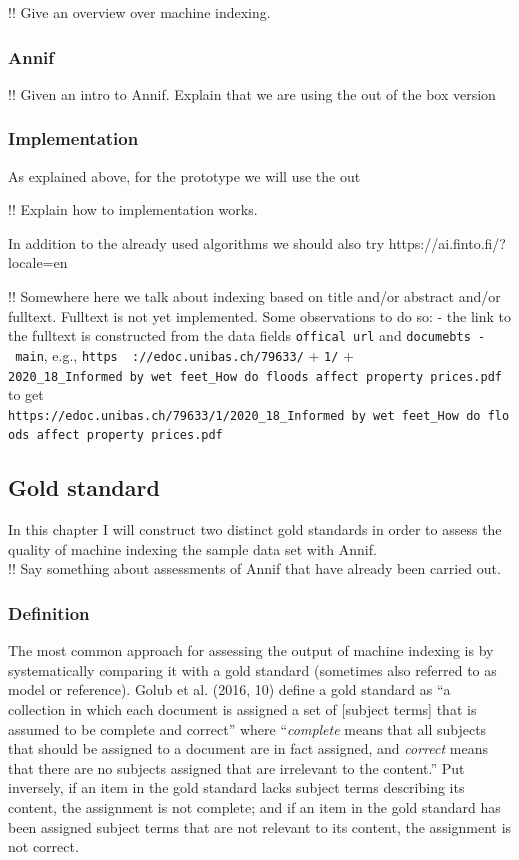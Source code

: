 !! Give an overview over machine indexing.

\hypertarget{annif}{%
\subsubsection{Annif}\label{annif}}

!! Given an intro to Annif. Explain that we are using the out of the box
version

\hypertarget{implementation}{%
\subsubsection{Implementation}\label{implementation}}

As explained above, for the prototype we will use the out

!! Explain how to implementation works.

In addition to the already used algorithms we should also try
https://ai.finto.fi/?locale=en

!! Somewhere here we talk about indexing based on title and/or abstract
and/or fulltext. Fulltext is not yet implemented. Some observations to
do so: - the link to the fulltext is constructed from the data fields
\texttt{offical\ url} and \texttt{documebts\ -\ main}, e.g.,
\texttt{https\ \ ://edoc.unibas.ch/79633/} + \texttt{1/} +
\texttt{2020\_18\_Informed\ by\ wet\ feet\_How\ do\ floods\ affect\ property\ prices.pdf}
to get
\texttt{https://edoc.unibas.ch/79633/1/2020\_18\_Informed\ by\ wet\ feet\_How\ do\ floods\ affect\ property\ prices.pdf}

\hypertarget{gold-standard}{%
\subsection{Gold standard}\label{gold-standard}}

In this chapter I will construct two distinct gold standards in order to
assess the quality of machine indexing the sample data set with Annif.\\
!! Say something about assessments of Annif that have already been
carried out.

\hypertarget{definition}{%
\subsubsection{Definition}\label{definition}}

The most common approach for assessing the output of machine indexing is
by systematically comparing it with a gold standard (sometimes also
referred to as model or reference). Golub et al. (2016, 10) define a
gold standard as ``a collection in which each document is assigned a set
of {[}subject terms{]} that is assumed to be complete and correct''
where ``\emph{complete} means that all subjects that should be assigned
to a document are in fact assigned, and \emph{correct} means that there
are no subjects assigned that are irrelevant to the content.'' Put
inversely, if an item in the gold standard lacks subject terms
describing its content, the assignment is not complete; and if an item
in the gold standard has been assigned subject terms that are not
relevant to its content, the assignment is not correct.


